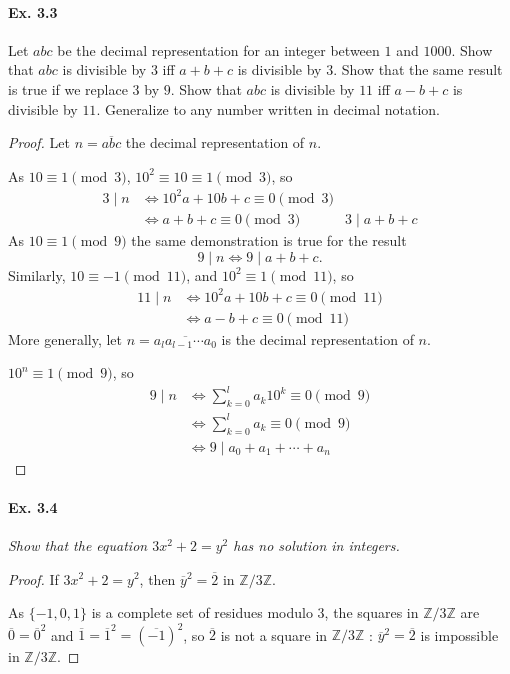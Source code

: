 \documentclass[11pt,a4paper]{article}
\newcommand{\Z}{\mathbb{Z}}
\begin{document}
{{\it \paragraph{Ex. 3.3}
Let $abc$ be the decimal representation for an integer between $1$ and $1000$. Show that $abc$ is divisible by $3$ iff $a + b + c$ is divisible by $3$. Show that the same result is true if we replace $3$ by $9$. Show that $abc$ is divisible by $11$ iff $a - b + c$ is divisible by $11$.  Generalize to any number written in decimal notation.
}

\begin{proof}
Let $n = \overline{abc}$ the decimal representation of $n$. 

As $10 \equiv 1 \pmod 3$, $10^2 \equiv 10 \equiv 1 \pmod 3$, so
\begin{align*}
3 \mid n &\iff 10^2 a + 10 b + c \equiv 0 \pmod 3\\ 
&\iff a+b+c \equiv 0 \pmod 3
& 3 \mid a+b+ c
\end{align*}
As $10 \equiv 1 \pmod 9$ the same demonstration is true for the result
$$9 \mid n \iff 9 \mid a+b+c.$$
Similarly, $10 \equiv -1 \pmod {11}$, and $10^2 \equiv 1 \pmod {11}$, so
\begin{align*}
11 \mid n &\iff 10^2 a + 10 b + c \equiv 0 \pmod {11}\\ 
&\iff a-b+c \equiv 0 \pmod {11}
\end{align*}
More generally, let $n = \overline{a_la_{l-1}\cdots a_0}$ is the decimal representation of $n$. 

$10^n \equiv 1 \pmod 9$, so
\begin{align*}
9 \mid n &\iff \sum_{k=0}^l a_k 10^k \equiv 0 \pmod 9\\
&\iff \sum_{k=0}^l a_k \equiv 0 \pmod 9\\
&\iff 9 \mid a_0+a_1+\cdots +a_n
\end{align*}
\end{proof}

\paragraph{Ex. 3.4}

{\it Show that the equation $3x^2 + 2 = y^2$ has no solution in integers.
}

\begin{proof}
If $3x^2+2 = y^2$, then  $\overline{y}^2 = \overline{2}$ in $\Z/3\Z$.


As $\{-1,0,1\}$ is a complete set of residues modulo $3$, the squares in $\Z/3\Z$ are $\overline{0} = \overline{0}^2$ and  $\overline{1} = \overline{1}^2 = (\overline{-1})^2$, so $\overline{2}$ is not a square in $\Z/3\Z$ : $\overline{y}^2 = \overline{2}$ is impossible in $\Z/3\Z$.


\end{proof}}
\end{document}
